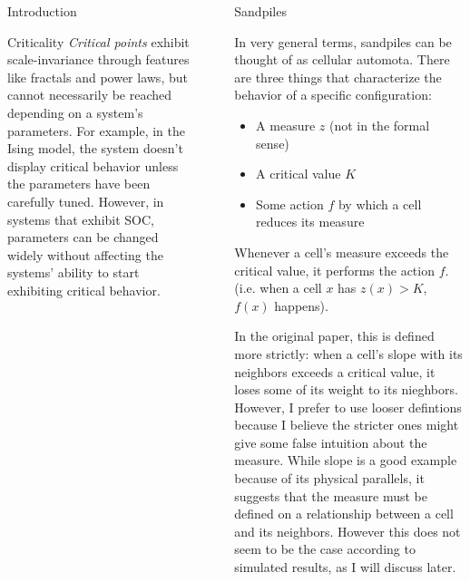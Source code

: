 \documentclass[final]{beamer}
\newlength{\sepwid}
\newlength{\onecolwid}
\begin{document}
\begin{frame}[t]
\begin{columns}[t]
\begin{column}{\onecolwid}
\begin{block}{Introduction}
\end{block}


\begin{block}{Criticality}
\textit{Critical points} exhibit scale-invariance through features like fractals and power laws, but cannot necessarily be reached depending on a system's parameters. For example, in the Ising model, the system doesn't display critical behavior unless the parameters have been carefully tuned. However, in systems that exhibit SOC, parameters can be changed widely without affecting the systems' ability to start exhibiting critical behavior.
\end{block}


\end{column} %

\begin{column}{\sepwid}\end{column} %

\begin{column}{\onecolwid} %


\begin{block}{Sandpiles}

In very general terms, sandpiles can be thought of as cellular automota. There are three things that characterize the behavior of a specific configuration:
\begin{itemize}
\item A measure $z$ (not in the formal sense)
\item A critical value $K$
\item Some action $f$ by which a cell reduces its measure
\end{itemize} 
Whenever a cell's measure exceeds the critical value, it performs the action $f$. (i.e. when a cell $x$ has $z(x)>K$, $f(x)$ happens).

In the original paper, this is defined more strictly: when a cell's slope with its neighbors exceeds a critical value, it loses some of its weight to its nieghbors. However, I prefer to use looser defintions because I believe the stricter ones might give some false intuition about the measure. While slope is a good example because of its physical parallels, it suggests that the measure must be defined on a relationship between a cell and its neighbors. However this does not seem to be the case according to simulated results, as I will discuss later.


\end{block}
\end{column}
\end{columns}
\end{frame}
\end{document}
